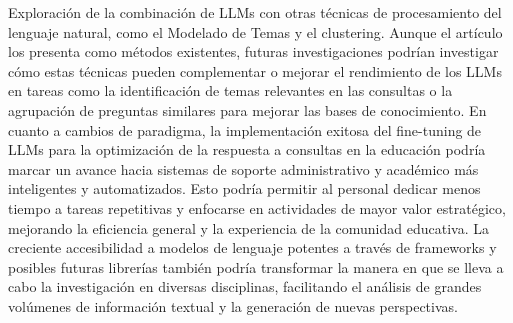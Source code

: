 \documentclass[12pt,twocolumn]{article}
\begin{document}
Exploración de la combinación de LLMs con otras técnicas de procesamiento del lenguaje natural, como el Modelado de Temas y el clustering. Aunque el artículo los presenta como métodos existentes, futuras investigaciones podrían investigar cómo estas técnicas pueden complementar o mejorar el rendimiento de los LLMs en tareas como la identificación de temas relevantes en las consultas o la agrupación de preguntas similares para mejorar las bases de conocimiento.
En cuanto a cambios de paradigma, la implementación exitosa del fine-tuning de LLMs para la optimización de la respuesta a consultas en la educación podría marcar un avance hacia sistemas de soporte administrativo y académico más inteligentes y automatizados. Esto podría permitir al personal dedicar menos tiempo a tareas repetitivas y enfocarse en actividades de mayor valor estratégico, mejorando la eficiencia general y la experiencia de la comunidad educativa. 
La creciente accesibilidad a modelos de lenguaje potentes a través de frameworks y posibles futuras librerías también podría transformar la manera en que se lleva a cabo la investigación en diversas disciplinas, facilitando el análisis de grandes volúmenes de información textual y la generación de nuevas perspectivas.
%
\printbibliography
%
\end{document}
